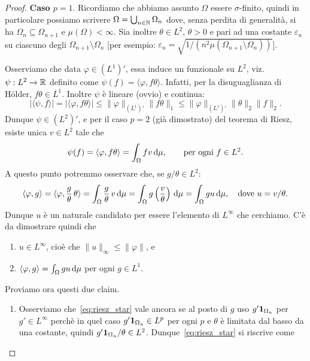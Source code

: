 \begin{proof}
	\textbf{Caso $p=1$}. Ricordiamo che abbiamo assunto $\Omega$ essere $\sigma$-finito, quindi in particolare possiamo scrivere $\Omega = \bigcup_{n \in \mathbb{N}} \Omega_n$ dove, senza perdita di generalità, si ha $\Omega_n \subseteq \Omega_{n+1}$ e $\mu(\Omega) < \infty$.
	Sia inoltre $\theta \in L^2$, $\theta > 0$ e pari ad una costante $\varepsilon_n$ su ciascuno degli $\Omega_{n+1} \setminus \Omega_n$ [per esempio: $\varepsilon_n = \sqrt{1/(n^2 \mu(\Omega_{n+1}\setminus \Omega_n))}$].

	Osserviamo che data $\varphi \in (L^1)'$, essa induce un funzionale su $L^2$, viz. $\psi : L^2 \to \mathbb{R}$ definito come $\psi(f) = \langle \varphi, f \theta \rangle$.
	Infatti, per la disuguaglianza di H\"older, $f\theta \in L^1$. Inoltre $\psi$ è lineare (ovvio) e continua:
	\begin{equation}
	\label{eq:riesz_norm}
		|\langle \psi, f \rangle|=|\langle \varphi, f\theta\rangle| \leq \|\varphi\|_{(L^1)'} \|f\theta\|_1 \leq \|\varphi\|_{(L^1)'}\|\theta\|_2\|f\|_2.
	\end{equation}
	Dunque $\psi \in (L^2)'$, e per il caso $p=2$ (già dimostrato) del teorema di Riesz, esiste unica $v \in L^2$ tale che
	\begin{equation*}
		\psi(f) = \langle \varphi, f\theta \rangle = \int_\Omega fv \,\mathrm{d}\mu, \qquad \text{per ogni $f \in L^2$}.
	\end{equation*}
	A questo punto potremmo osservare che, se $g/\theta \in L^2$:
	\begin{equation}
	\label{eq:riesz_star}
		\langle \varphi, g \rangle = \langle \varphi, \frac{g}\theta\, \theta \rangle
		= \int_\Omega \frac{g}\theta\, v \,\mathrm{d}\mu
		= \int_\Omega g \left( \frac{v}\theta \right)\,\mathrm{d}\mu
		= \int_\Omega gu\,\mathrm{d}\mu, \quad \text{dove $u = v/\theta$}.
	\end{equation}
	Dunque $u$ è un naturale candidato per essere l'elemento di $L^\infty$ che cerchiamo. C'è da dimostrare quindi che
	\begin{enumerate}
		\item $u \in L^\infty$, cioè che $\|u\|_\infty \leq \|\varphi\|$, e
		\item $\langle \varphi, g \rangle = \int_\Omega gu\,\mathrm{d}\mu$ per ogni $g \in L^1$.
	\end{enumerate}
	Proviamo ora questi due claim.
	\begin{enumerate}
		\item Osserviamo che~\eqref{eq:riesz_star} vale ancora se al posto di $g$ uso $g' {\boldsymbol{1}}_{\Omega_n}$ per $g' \in L^\infty$ perchè in quel caso $g' {\boldsymbol{1}}_{\Omega_n} \in L^p$ per ogni $p$ e $\theta$ è limitata dal basso da una costante, quindi $g' {\boldsymbol{1}}_{\Omega_n}/\theta \in L^2$. Dunque~\eqref{eq:riesz_star} si riscrive come

\end{enumerate}
\end{proof}
